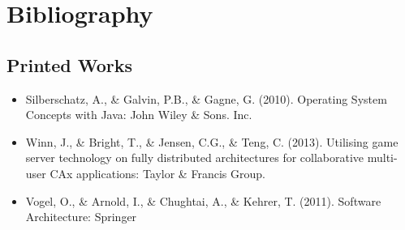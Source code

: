 \section{Bibliography}

\subsection{Printed Works}
\begin{itemize}
	\item Silberschatz, A., \& Galvin, P.B., \& Gagne, G. (2010).
   Operating System Concepts with Java: John Wiley \& Sons. Inc.
   \item Winn, J., \& Bright, T., \& Jensen, C.G., \& Teng, C. (2013). Utilising game server technology on fully distributed architectures for collaborative multi-user CAx applications: Taylor \& Francis Group.
   \item Vogel, O., \& Arnold, I., \& Chughtai, A., \& Kehrer, T. (2011). Software Architecture: Springer
\end{itemize}

